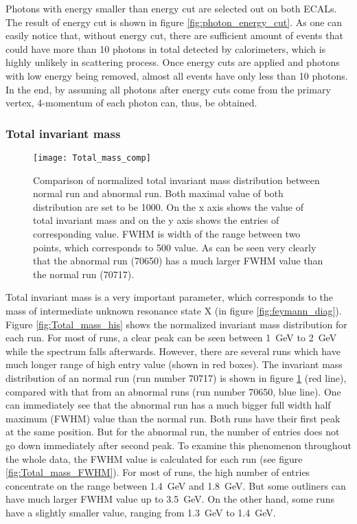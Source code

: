 Photons with energy smaller than energy cut are selected out on both ECALs. The result of energy cut is shown in figure \ref{fig:photon_energy_cut}. As one can easily notice that, without energy cut, there are sufficient amount of events that could have more than 10 photons in total detected by calorimeters, which is highly unlikely in scattering process. Once energy cuts are applied and photons with low energy being removed, almost all events have only less than 10 photons. In the end, by assuming all photons after energy cuts come from the primary vertex, 4-momentum of each photon can, thus, be obtained.
\subsubsection{Total invariant mass}
\begin{figure}[!b]
	\centering
	\texttt{[image: Total\_mass\_comp]}
	\caption{Comparison of normalized total invariant mass distribution between normal run and abnormal run. Both maximal value of both distribution are set to be 1000. On the x axis shows the value of total invariant mass and on the y axis shows the entries of corresponding value. FWHM is width of the range between two points, which corresponds to 500 value. As can be seen very clearly that the abnormal run (70650) has a much larger FWHM value than the normal run (70717).}
	\label{fig:Total_mass_comp}
\end{figure}
Total invariant mass is a very important parameter, which corresponds to the mass of intermediate unknown resonance state X (in figure \ref{fig:feymann_diag}). Figure \ref{fig:Total_mass_his} shows the normalized invariant mass distribution for each run. For most of runs, a clear peak can be seen between \SI{1}{\giga\electronvolt} to \SI{2}{\giga\electronvolt} while the spectrum falls afterwards. However, there are several runs which have much longer range of high entry value (shown in red boxes). The invariant mass distribution of an normal run (run number 70717) is shown in figure \ref{fig:Total_mass_comp} (red line), compared with that from an abnormal runs (run number 70650, blue line). One can immediately see that the abnormal run has a much bigger full width half maximum (FWHM) value than the normal run. Both runs have their first peak at the same position. But for the abnormal run, the number of entries does not go down immediately after second peak. To examine this phenomenon throughout the whole data, the FWHM value is calculated for each run (see figure \ref{fig:Total_mass_FWHM}). For most of runs, the high number of entries concentrate on the range between \SI{1.4}{\giga\electronvolt} and \SI{1.8}{\giga\electronvolt}. But some outliners can have much larger FWHM value up to \SI{3.5}{\giga\electronvolt}. On the other hand, some runs have a slightly smaller value, ranging from \SI{1.3}{\giga\electronvolt} to \SI{1.4}{\giga\electronvolt}.


